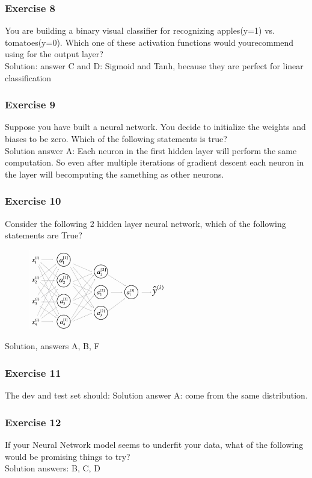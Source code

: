 \subsubsection*{Exercise 8}
You are building a binary visual classifier for recognizing apples(y=1) vs. tomatoes(y=0). Which one of these activation functions would yourecommend using for the output layer?
\\Solution: answer C and D: Sigmoid and Tanh, because they are perfect for linear classification
\subsubsection*{Exercise 9}
Suppose you have built a neural network. You decide to initialize the weights and biases to be zero. Which of the following statements is true?\\
Solution answer A: Each neuron in the first hidden layer will perform the same computation. So even after multiple iterations of gradient descent each neuron in the layer will becomputing the samething as other neurons.
\subsubsection*{Exercise 10}
Consider the following 2 hidden layer neural network, which of the following statements are True?
\begin{figure}[htbp]
    \centering
    \includegraphics[width=6cm]{ExerciseBook/01-NeuralNetwork/exercise10.png}\newline
\end{figure}
Solution, answers A, B, F
\subsubsection*{Exercise 11}
The dev and test set should:
Solution answer A: come from the same distribution.
\subsubsection*{Exercise 12}
If your Neural Network model seems to underfit your data, what of the following would be promising things to try?\\
Solution answers: B, C, D